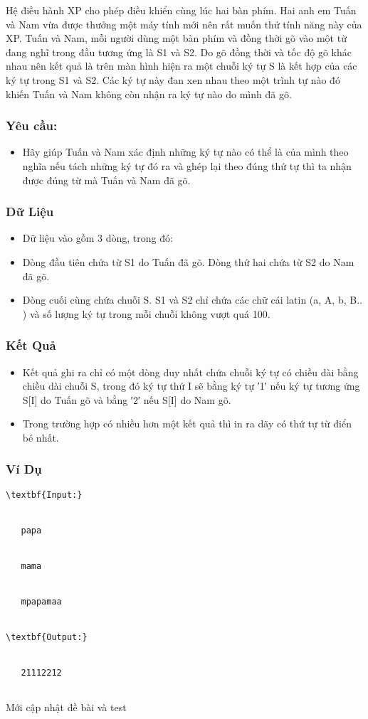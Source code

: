 



   Hệ điều hành XP cho phép điều khiển cùng lúc hai bàn phím. Hai anh em Tuấn và Nam vừa được thưởng một máy tính mới nên rất muốn thử tính năng này của XP. Tuấn và Nam, mỗi người dùng một bàn phím và đồng thời gõ vào một từ đang nghĩ trong đầu tương ứng là S1 và S2. Do gõ đồng thời và tốc độ gõ khác nhau nên kết quả là trên màn hình hiện ra một chuỗi ký tự S là kết hợp của các ký tự trong S1 và S2. Các ký tự này đan xen nhau theo một trình tự nào đó khiến Tuấn và Nam không còn nhận ra ký tự nào do mình đã gõ.  

\subsubsection{   Yêu cầu:  }
\begin{itemize}
	\item     Hãy giúp Tuấn và Nam xác định những ký tự nào có thể  là của mình theo nghĩa nếu tách những ký tự đó ra và ghép lại theo đúng thứ tự thì ta nhận được đúng từ mà Tuấn và Nam đã gõ.   
\end{itemize}

\subsubsection{   Dữ Liệu  }
\begin{itemize}
	\item     Dữ liệu vào gồm 3 dòng, trong đó:   
	\item     Dòng đầu tiên chứa từ S1 do Tuấn đã gõ. Dòng thứ hai chứa từ S2 do Nam đã gõ.   
	\item     Dòng cuối cùng chứa chuỗi S. S1 và S2 chỉ chứa các chữ cái latin (a, A, b, B.. ) và số lượng ký tự trong mỗi chuỗi không vượt quá 100.   
\end{itemize}

\subsubsection{   Kết Quả  }
\begin{itemize}
	\item     Kết quả ghi ra chỉ có một dòng duy nhất chứa chuỗi ký tự có chiều dài bằng chiều dài chuỗi S, trong đó ký tự thứ I sẽ bằng ký tự ′1′ nếu ký tự tương ứng S[I] do Tuấn gõ và bằng ′2′ nếu S[I] do Nam gõ.   
	\item     Trong trường hợp có nhiều hơn một kết quả thì in ra dãy có thứ tự từ điển bé nhất.   
\end{itemize}

\subsubsection{   Ví Dụ  }
\begin{verbatim}
\textbf{Input:}


   papa


   mama


   mpapamaa


\textbf{Output:}


   21112212


\end{verbatim}
	\item    Mới cập nhật đề bài và test  
